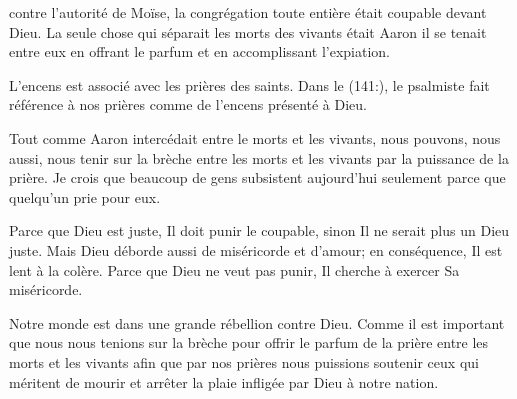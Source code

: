 


 contre l'autorité de Moïse,
 la congrégation toute entière était coupable devant Dieu.
 La seule chose qui séparait les morts des vivants était Aaron
 \ocadr{}il se tenait entre eux en offrant le parfum
 et en accomplissant l'expiation.

L'encens est associé avec les prières des saints.
 Dans le (141:), le psalmiste
 fait référence à nos prières comme de l'encens présenté à Dieu.


Tout comme Aaron intercédait entre le morts et les vivants, nous pouvons,
 nous aussi, nous tenir sur la brèche entre les morts et les vivants
 par la puissance de la prière.
 Je crois que beaucoup de gens subsistent aujourd'hui
 seulement parce que quelqu'un prie pour eux.

Parce que Dieu est juste, Il doit punir le coupable,
 sinon Il ne serait plus un Dieu juste.
 Mais Dieu déborde aussi de miséricorde et d'amour;
 en conséquence, Il est lent à la colère.
 Parce que Dieu ne veut pas punir, Il cherche à exercer Sa miséricorde.

Notre monde est dans une grande rébellion contre Dieu.
 Comme il est important que nous nous tenions sur la brèche
 pour offrir le parfum de la prière entre les morts et les vivants
 \ocadr{}afin que par nos prières nous puissions soutenir
 ceux qui méritent de mourir et arrêter la plaie infligée
 par Dieu à notre nation. 

\dvrule





